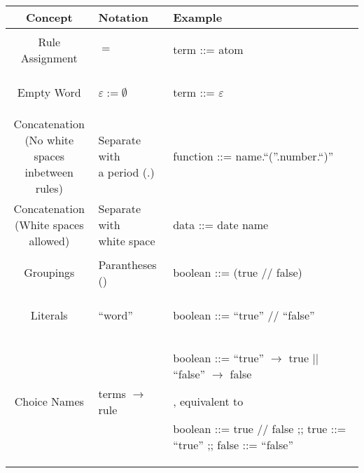 \begin{center}
  \begin{tabular}{ | c | p{2cm} | p{6cm} | }
  \hline
  \textbf{Concept} & \textbf{Notation} & \textbf{Example} \\
  \hline
	Rule Assignment & $=$ & \begin{bnf} term ::= atom\end{bnf}\\
  \hline
  Empty Word & $\varepsilon := \emptyset$ & \begin{bnf} term ::= $\varepsilon$ \end{bnf} \\
    \hline
  \makecell{Concatenation \\ (No white spaces \\ inbetween rules)} & \makecell{Separate with \\  a period (.)}&  \begin{bnf} function ::= name.``(''.number.``)''\end{bnf} \\
  \hline
  \makecell{Concatenation \\ (White spaces \\ allowed)} & \makecell{Separate with \\ white space} & \begin{bnf} data ::= date name\end{bnf} \\
  \hline
  Groupings & Parantheses () & \begin{bnf} boolean ::= (true // false)\end{bnf} \\
  \hline
  Literals & ``word'' & \begin{bnf} boolean ::= ``true'' // ``false'' \end{bnf} \\
  \hline
  Choice Names & terms $\to$ rule & \makecell{\begin{bnf} boolean ::= ``true'' $\to$ true || ``false'' $\to$ false \end{bnf}, \\ equivalent to \\ \begin{bnf}  boolean ::= true // false ;; true ::= ``true'' ;; false ::= ``false'' \end{bnf}} \\
  \hline


\end{tabular}
\end{center}
